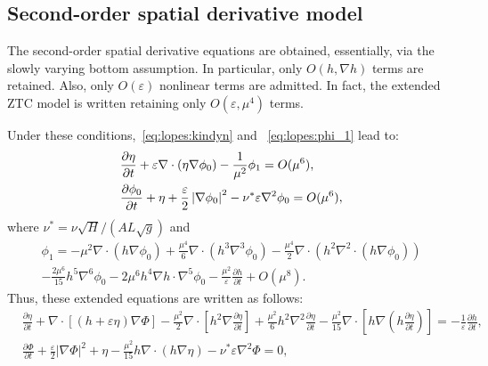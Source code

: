 \subsection{Second-order spatial derivative model}
The  second-order  spatial derivative equations
 are obtained, essentially, via the
slowly varying bottom assumption. In particular, only
$O(h,\nabla h)$ terms are retained.  Also, only $O(\varepsilon)$
nonlinear terms are admitted.  In fact,
the extended ZTC model is written retaining only
$O(\varepsilon,\mu^4)$ terms.

Under these conditions,~\eqref{eq:lopes:kindyn} and
~\eqref{eq:lopes:phi_1} lead to:
\begin{subequations}\label{eq:lopes:kindyn2}
\begin{align}
&\displaystyle\frac{\partial \eta}{\partial t}+\varepsilon\nabla\cdot(\eta\nabla\phi_0)
-\frac{1}{\mu^2}\phi_1=O(\mu^{6}),\vspace{0.3cm}\label{eq:lopes:kindyn2-a}
\\
&\displaystyle\frac{\partial \phi_0}{\partial t}+\eta + \frac{\varepsilon}{2}
\left|\nabla\phi_0\right|^2-\nu^*\varepsilon\nabla^2\phi_0
=O(\mu^{6}),\label{eq:lopes:kindyn2-b}
\end{align}
\end{subequations}
where $\nu^*=\nu\sqrt{H}/(AL\sqrt{g})$
and
\begin{multline}\label{eq:lopes:phi_2}
\phi_1= -\mu^{2}\nabla\cdot\left(h\nabla\phi_0\right)
+\frac{\mu^{4}}{6}\nabla\cdot\left(h^3\nabla^3\phi_0\right)
-\frac{\mu^{4}}{2}\nabla\cdot\left(h^2
\nabla^2\cdot\left(h\nabla\phi_0\right)
\right)\\
-\frac{2\mu^6}{15}h^5\nabla^6\phi_0-2\mu^6h^4\nabla
h\cdot\nabla^5\phi_0
-\frac{\mu^2}{\varepsilon}\frac{\partial h}{\partial t}+O(\mu^{8}).
\end{multline}
Thus, these extended equations are written as follows:
\begin{subequations}\label{eq:lopes:ztcdimensionless}
\begin{align}
&\frac{\partial\eta}{\partial t}
  +\nabla\cdot[(h+\varepsilon\eta)\nabla{\Phi}] -\frac{\mu^2}{2}\nabla\cdot
  [h^{2}\nabla\frac{\partial \eta} {\partial t}]
  +\frac{\mu^2}{6}h^{2}\nabla^2\frac{\partial\eta}{\partial t}
  -\frac{\mu^2}{15}\nabla\cdot[h\nabla(h\frac{\partial\eta}
    {\partial
      t})]=-\frac{1}{\varepsilon}\frac{\partial h}{\partial t}, \label{eq:lopes:ztcdimensionless-a}\\ &\frac{\partial
    \Phi}{\partial t} +\frac{\varepsilon}{2}|\nabla\Phi|^2+\eta-
  \frac{\mu^2}{15}h\nabla\cdot(h\nabla\eta)-\nu^*\varepsilon\nabla^2\Phi
=0, \label{eq:lopes:ztcdimensionless-b}
\end{align}
\end{subequations}
